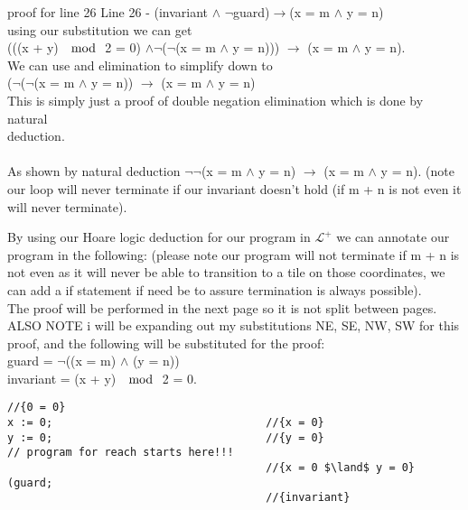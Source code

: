 \documentclass{article}
\begin{document}
\begin{enumerate}[(a)]
     \begin{list}
        \item {proof for line 26}
        Line 26 - (invariant $\land$ $\neg$guard)$\to$(x = m $\land$ y = n)\\
        using our substitution we can get\\
        (((x + y) $\mod$ 2 = 0) $\land \neg$($\neg$(x = m $\land$ y = n))) $\to$ (x = m $\land$ y = n).\\ We can use and elimination to simplify down to\\
        ($\neg$($\neg$(x = m $\land$ y = n)) $\to$ (x = m $\land$ y = n)\\
        This is simply just a proof of double negation elimination which is done by natural \\deduction.\\
        \\
        As shown by natural deduction $\neg\neg$(x = m $\land$ y = n) $\to$ (x = m $\land$ y = n).
        (note our loop will never terminate if our invariant doesn't hold (if m + n is not even it will never terminate).
    \end{list}
By using our Hoare logic deduction for our program in $\mathcal{L}^{+}$ we can annotate our program in the following: (please note our program will not terminate if m + n is not even as it will never be able to transition to a tile on those coordinates, we can add a if statement if need be to assure termination is always possible).\\
The proof will be performed in the next page so it is not split between pages.
\newpage
ALSO NOTE i will be expanding out my substitutions NE, SE, NW, SW for this proof, and the following will be substituted for the proof:\\
    guard = $\neg$((x = m) $\land$ (y = n))\\
    invariant = (x + y) $\mod$ 2 = 0.\\
    \begin{lstlisting}[language=Maple,mathescape=true]
                                        //{0 = 0}
x := 0;                                 //{x = 0}
y := 0;                                 //{y = 0}
// program for reach starts here!!!
                                        //{x = 0 $\land$ y = 0}
(guard;
                                        //{invariant}

\end{lstlisting}
\end{enumerate}
\end{document}

